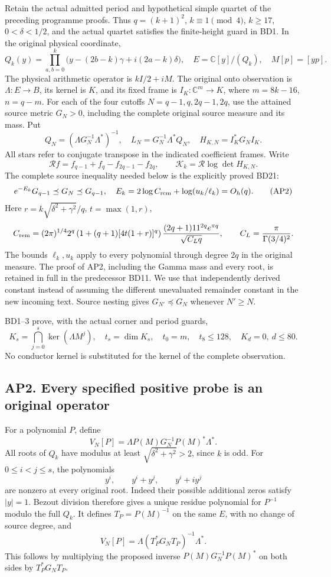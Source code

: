 \documentclass[11pt]{article}
\begin{document}
Retain the actual admitted period and hypothetical simple quartet of the preceding programme proofs. Thus \(q=(k+1)^2\), \(k\equiv1\pmod4\), \(k\ge17\), \(0<\delta<1/2\), and the actual quartet satisfies the finite-height guard in BD1. In the original physical coordinate, \[
 Q_k(y)=\prod_{a,b=0}^k\bigl(y-(2b-k)\gamma+i(2a-k)\delta\bigr),
 \quad E=\mathbb C[y]/(Q_k),\quad M[p]=[yp].
\] The physical arithmetic operator is \(kI/2+iM\). The original onto observation is \(\Lambda:E\to B\), its kernel is \(K\), and its fixed frame is \(I_K:\mathbb C^m\to K\), where \(m=8k-16\), \(n=q-m\). For each of the four cutoffs \(N=q-1,q,2q-1,2q\), use the attained source metric \(G_N>0\), including the complete original source measure and its mass. Put \[
 Q_N=(\Lambda G_N^{-1}\Lambda^*)^{-1},\quad
 L_N=G_N^{-1}\Lambda^*Q_N,\quad H_{K,N}=I_K^*G_NI_K.
 \tag{AP1}
\] All stars refer to conjugate transpose in the indicated coefficient frames. Write \[
 \mathcal R f=f_{q-1}+f_q-f_{2q-1}-f_{2q},\qquad
 \mathcal K_k=\mathcal R\log\det H_{K,N}.
\] The complete source inequality needed below is the explicitly proved BD21: \[
 e^{-E_k}G_{q-1}\preceq G_N\preceq G_{q-1},
 \quad E_k=2\log C_{\rm rem}+\log(u_k/\ell_k)=O_h(q).
 \tag{AP2}
\] Here \(r=k\sqrt{\delta^2+\gamma^2}/q\), \(t=\max(1,r)\), \[
 C_{\rm rem}=(2\pi)^{1/4}2^q
 \left(1+(q+1)[4t(1+r)]^q\right)
 \frac{(2q+1)11^{2q}e^{\pi q}}{\sqrt{C_Lq}},
 \qquad C_L=\frac{\pi}{\Gamma(3/4)^2}.
\] The bounds \(\ell_k,u_k\) apply to every polynomial through degree \(2q\) in the original measure. The proof of AP2, including the Gamma mass and every root, is retained in full in the predecessor BD11. We use that independently derived constant instead of assuming the different unevaluated remainder constant in the new incoming text. Source nesting gives \(G_{N'}\preceq G_N\) whenever \(N'\ge N\).

BD1--3 prove, with the actual corner and period guards, \[
 K_s=\bigcap_{j=0}^s\ker(\Lambda M^j),\quad
 t_s=\dim K_s,\quad t_0=m,\quad t_8\le128,\quad K_d=0,\ d\le80.
 \tag{AP3}
\] No conductor kernel is substituted for the kernel of the complete observation.

\subsection{AP2. Every specified positive probe is an original operator}\label{ap2.-every-specified-positive-probe-is-an-original-operator}

For a polynomial \(P\), define \[
 V_N[P]=\Lambda P(M)G_N^{-1}P(M)^*\Lambda^*.
 \tag{AP4}
\] All roots of \(Q_k\) have modulus at least \(\sqrt{\delta^2+\gamma^2}>2\), since \(k\) is odd. For \(0\le i<j\le s\), the polynomials \[
 y^i,\qquad y^i+y^j,\qquad y^i+iy^j
 \tag{AP5}
\] are nonzero at every original root. Indeed their possible additional zeros satisfy \(|y|=1\). Bezout division therefore gives a unique residue polynomial for \(P^{-1}\) modulo the full \(Q_k\). It defines \(T_P=P(M)^{-1}\) on the same \(E\), with no change of source degree, and \[
 V_N[P]=\Lambda(T_P^*G_NT_P)^{-1}\Lambda^*.
 \tag{AP6}
\] This follows by multiplying the proposed inverse \(P(M)G_N^{-1}P(M)^*\) on both sides by \(T_P^*G_NT_P\).
\end{document}
